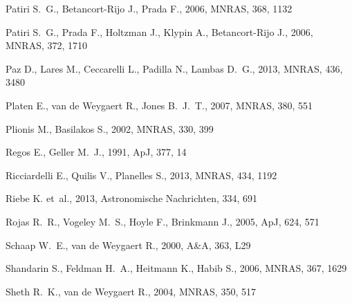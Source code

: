 \documentclass[a4,useAMS,usenatbib,usegraphicx]{mn2e}
\newcommand{\apj}{ApJ}
\newcommand{\mnras}{MNRAS}
\newcommand{\aap}{A\&A}
\begin{document}
\begin{thebibliography}{}
{Patiri} S.~G.,  {Betancort-Rijo} J.,    {Prada} F.,  2006, \mnras, 368, 1132

{Patiri} S.~G.,  {Prada} F.,  {Holtzman} J.,  {Klypin} A.,    {Betancort-Rijo}
  J.,  2006, \mnras, 372, 1710

{Paz} D.,  {Lares} M.,  {Ceccarelli} L.,  {Padilla} N.,    {Lambas} D.~G.,
  2013, \mnras, 436, 3480

{Platen} E.,  {van de Weygaert} R.,    {Jones} B.~J.~T.,  2007, \mnras, 380,
  551

{Plionis} M.,  {Basilakos} S.,  2002, \mnras, 330, 399

{Regos} E.,  {Geller} M.~J.,  1991, \apj, 377, 14

{Ricciardelli} E.,  {Quilis} V.,    {Planelles} S.,  2013, \mnras, 434, 1192

{Riebe} K.  et~al., 2013, Astronomische Nachrichten, 334, 691

{Rojas} R.~R.,  {Vogeley} M.~S.,  {Hoyle} F.,    {Brinkmann} J.,  2005, \apj,
  624, 571

{Schaap} W.~E.,  {van de Weygaert} R.,  2000, \aap, 363, L29

{Shandarin} S.,  {Feldman} H.~A.,  {Heitmann} K.,    {Habib} S.,  2006, \mnras,
  367, 1629

{Sheth} R.~K.,  {van de Weygaert} R.,  2004, \mnras, 350, 517


\end{thebibliography}
\end{document}
